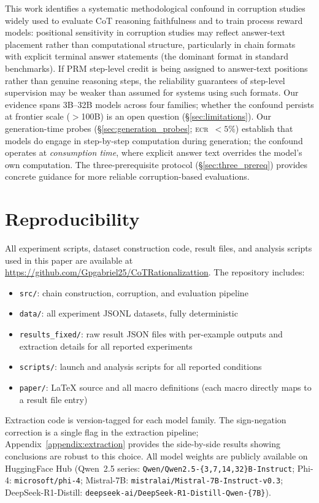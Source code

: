 \documentclass{article}
\theoremstyle{definition}
\theoremstyle{definition}
\begin{document}
This work identifies a systematic methodological confound in corruption studies
widely used to evaluate CoT reasoning faithfulness and to train process reward
models: positional sensitivity in corruption
studies may reflect answer-text placement rather than computational structure,
particularly in chain formats with explicit terminal answer statements
(the dominant format in standard benchmarks).
If PRM step-level credit is being assigned to answer-text positions rather than
genuine reasoning steps, the reliability guarantees
of step-level supervision may be weaker than assumed for systems using such formats.
Our evidence spans 3B--32B models across four families; whether the confound
persists at frontier scale ($>$100B) is an open question (\S\ref{sec:limitations}).
Our generation-time probes (\S\ref{sec:generation_probes};
\textsc{ecr}~$<5\%$) establish that models do engage in step-by-step computation
during generation; the confound operates at \emph{consumption time}, where
explicit answer text overrides the model's own computation.
The three-prerequisite protocol (\S\ref{sec:three_prereq}) provides concrete
guidance for more reliable corruption-based evaluations.

\section*{Reproducibility}

All experiment scripts, dataset construction code, result files, and analysis
scripts used in this paper are available at
\url{https://github.com/Gpgabriel25/CoTRationalizattion}.
The repository includes:
\begin{itemize}[nosep]
  \item \texttt{src/}: chain construction, corruption, and evaluation pipeline
  \item \texttt{data/}: all experiment JSONL datasets, fully deterministic
  \item \texttt{results\_fixed/}: raw result JSON files with per-example
  outputs and extraction details for all reported experiments
  \item \texttt{scripts/}: launch and analysis scripts for all reported conditions
  \item \texttt{paper/}: LaTeX source and all macro definitions (each macro
  directly maps to a result file entry)
\end{itemize}
Extraction code is version-tagged for each model family.
The sign-negation correction is a single flag in the extraction pipeline;
Appendix~\ref{appendix:extraction} provides the side-by-side results showing
conclusions are robust to this choice.
All model weights are publicly available on HuggingFace Hub (Qwen~2.5 series:
\texttt{Qwen/Qwen2.5-\{3,7,14,32\}B-Instruct}; Phi-4: \texttt{microsoft/phi-4};
Mistral-7B: \texttt{mistralai/Mistral-7B-Instruct-v0.3};
DeepSeek-R1-Distill: \texttt{deepseek-ai/DeepSeek-R1-Distill-Qwen-\{7B\}}).
\end{document}
